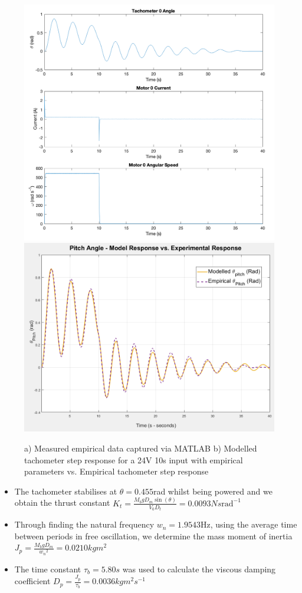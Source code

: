 \documentclass[11pt]{article}
\begin{document}
\begin{figure}[ht!]
    \centering
    \includegraphics[scale = 0.35]{W2Empirical.png}
    \includegraphics[scale = 0.35]{WS2_10sData2.PNG} %
    \caption{a) Measured empirical data captured via MATLAB b) Modelled tachometer step response for a 24V 10s input with empirical parameters vs. Empirical tachometer step response}
    \label{fig:W2_emp_data}
\end{figure}
\begin{itemize}
    \item %
    The tachometer stabilises at $\theta = 0.455$rad whilst being powered and we obtain the thrust constant $K_t = \frac{M_b g D_m \sin(\theta)}{V_0 D_t} = 0.0093Ns\text{rad}^{-1}$
    \item %
    Through finding the natural frequency $w_n = 1.9543$Hz, using the average time between periods in free oscillation, we determine the mass moment of inertia $J_p = \frac{M_b g D_m}{{w_n}^2} = 0.0210kgm^2$
    \item %
    The time constant $\tau_b = 5.80s$ was used to calculate the viscous damping coefficient $D_p = \frac{J_p}{\tau_b} = 0.0036kgm^2s^{-1}$
\end{itemize}
\end{document}

